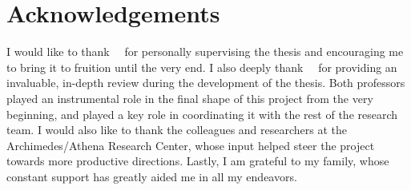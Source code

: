 %
\chapter*{Acknowledgements}
\label{sec:acknowledgements}
\vspace*{-10mm}


I would like to  thank \thesisSupervisorTitle \ \thesisSupervisor \ for personally supervising the thesis and encouraging me to bring it to fruition until the very end.  I also deeply thank \thesisAcknowledgmentTitle \ \thesisAcknowledgment \ for providing an invaluable, in-depth review during the development of the thesis. Both professors played an instrumental role in the final shape of this project from the very beginning, and played a key role in coordinating it with the rest of the research team.  I would also like to thank the colleagues and researchers at the Archimedes/Athena Research Center, whose input helped steer the project towards more productive directions. Lastly, I am grateful to my family, whose constant support has greatly aided me in all my endeavors. 